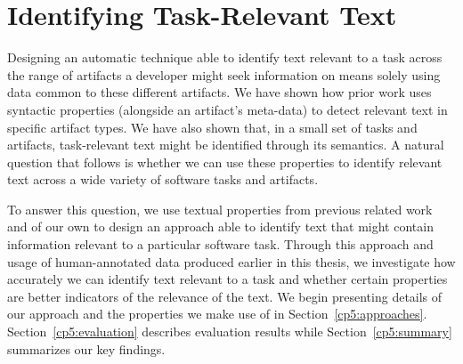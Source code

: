 \setcounter{chapter}{4}
\setcounter{rq}{1}


\chapter{Identifying Task-Relevant Text}
\label{ch:identifying}



Designing an automatic technique able to identify text relevant to a task across the range of artifacts a developer might seek information on means solely using data common to these different artifacts.
We have shown how  prior work uses syntactic properties (alongside an artifact's meta-data)
to detect relevant text in specific artifact types.
We have also shown that, in a small set of tasks and artifacts, task-relevant text might be identified through its semantics.
A natural question that follows is whether we can use these properties to identify relevant text across a wide variety of software tasks and artifacts.




To answer this question, we use textual properties from previous related work and of our own 
to design an approach able to identify text that might contain information relevant to a particular software task.
Through this approach and usage of human-annotated data produced earlier in this thesis, we 
investigate how accurately we can identify text relevant to a task and whether certain properties are better indicators of the relevance of the text.
We begin presenting details of our approach and the properties we make use of in Section~\ref{cp5:approaches}.
Section~\ref{cp5:evaluation} describes evaluation results while
Section~\ref{cp5:summary} summarizes our key findings.








